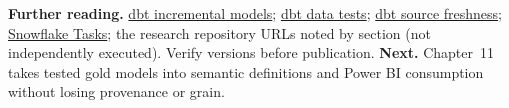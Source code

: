 \documentclass[11pt,twoside]{article}
\begin{document}
\textbf{Further reading.} \href{https://docs.getdbt.com/docs/build/incremental-models}{dbt incremental models}; \href{https://docs.getdbt.com/docs/build/data-tests}{dbt data tests}; \href{https://docs.getdbt.com/docs/deploy/source-freshness}{dbt source freshness}; \href{https://docs.snowflake.com/en/user-guide/tasks-intro}{Snowflake Tasks}; the research repository URLs noted by section (not independently executed). Verify versions before publication.
\textbf{Next.} Chapter~11 takes tested gold models into semantic definitions and Power BI consumption without losing provenance or grain.
\end{document}

